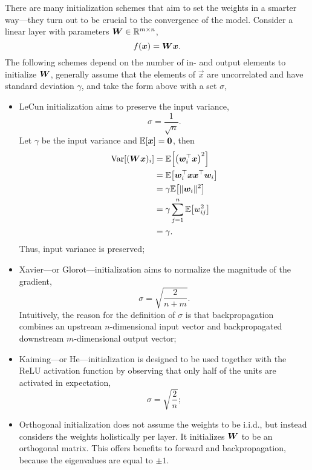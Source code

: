 There are many initialization schemes that aim to set the weights in a smarter way---they turn out
to be crucial to the convergence of the model. Consider a linear layer with parameters $\bm{W} \in
    \mathbb{R}^{m \times n}$, \[
    f(\bm{x}) = \bm{W} \bm{x}.
\]
The following schemes depend on the number of in- and output elements to initialize
$\bm{W}$, generally
assume that the elements of $\vec{x}$ are uncorrelated and have standard deviation $\gamma$, and
take the form above with a set $\sigma$,
\begin{itemize}
    \item LeCun initialization \citep{lecun2002efficient} aims to preserve the input variance, \[
              \sigma = \frac{1}{\sqrt{n}}.
          \]
          Let $\gamma$ be the input variance and $\mathbb{E}[\bm{x}] = \bm{0}$, then
          \begin{align*}
              \Var[(\mat{W} \vec{x})_i] & = \E \lft[ \lft( \transpose{\vec{w}_i} \vec{x} \rgt)^2 \rgt]                 \\
                                        & = \E \lft[ \transpose{\vec{w}_i} \vec{x} \transpose{\vec{x}} \vec{w}_i \rgt] \\
                                        & = \gamma \E \lft[ \| \vec{w}_i \|^2 \rgt]                                    \\
                                        & = \gamma \sum_{j=1}^{n} \E\lft[w_{ij}^2\rgt]                                 \\
                                        & = \gamma.
          \end{align*}
          Thus, input variance is preserved;

    \item Xavier---or Glorot---initialization \citep{glorot2010understanding} aims to normalize the magnitude
          of the gradient, \[
              \sigma = \sqrt{\frac{2}{n+m}}.
          \]
          Intuitively, the reason for the definition of $\sigma$ is that backpropagation combines an upstream
          $n$-dimensional input vector and backpropagated downstream $m$-dimensional output vector;

    \item Kaiming---or He---initialization \citep{he2015delving} is designed to be used together with the
          ReLU activation function by observing that only half of the units are activated in expectation, \[
              \sigma = \sqrt{\frac{2}{n}};
          \]
    \item Orthogonal initialization \citep{saxe2013exact,hu2020provable} does not assume the weights to be
          i.i.d., but instead considers the weights holistically per layer. It initializes $\bm{W}$ to be an
          orthogonal matrix. This offers benefits to forward and backpropagation, because the eigenvalues are
          equal to $\pm 1$.
\end{itemize}

